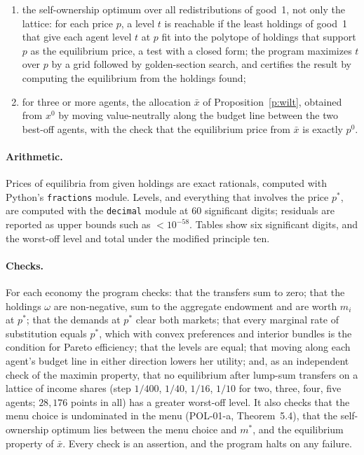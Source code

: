 \documentclass{situationist-preprint}
\begin{document}
\begin{enumerate}[label=(\roman*),itemsep=0pt]
\item the self-ownership optimum over all redistributions of good~1, not only the lattice: for each price $p$, a level $t$ is reachable if the least holdings of good~1 that give each agent level $t$ at $p$ fit into the polytope of holdings that support $p$ as the equilibrium price, a test with a closed form; the program maximizes $t$ over $p$ by a grid followed by golden-section search, and certifies the result by computing the equilibrium from the holdings found;
\item for three or more agents, the allocation $\bar{x}$ of Proposition~\ref{p:wilt}, obtained from $x^0$ by moving value-neutrally along the budget line between the two best-off agents, with the check that the equilibrium price from $\bar{x}$ is exactly $p^0$.
\end{enumerate}

\paragraph{Arithmetic.} Prices of equilibria from given holdings are exact rationals, computed with Python's \texttt{fractions} module. Levels, and everything that involves the price $p^*$, are computed with the \texttt{decimal} module at $60$ significant digits; residuals are reported as upper bounds such as $<10^{-58}$. Tables show six significant digits, and the worst-off level and total under the modified principle ten.

\paragraph{Checks.} For each economy the program checks: that the transfers sum to zero; that the holdings $\omega$ are non-negative, sum to the aggregate endowment and are worth $m_i$ at $p^*$; that the demands at $p^*$ clear both markets; that every marginal rate of substitution equals $p^*$, which with convex preferences and interior bundles is the condition for Pareto efficiency; that the levels are equal; that moving along each agent's budget line in either direction lowers her utility; and, as an independent check of the maximin property, that no equilibrium after lump-sum transfers on a lattice of income shares (step $1/400$, $1/40$, $1/16$, $1/10$ for two, three, four, five agents; $28{,}176$ points in all) has a greater worst-off level. It also checks that the menu choice is undominated in the menu (POL-01-a, Theorem~5.4), that the self-ownership optimum lies between the menu choice and $m^*$, and the equilibrium property of $\bar{x}$. Every check is an assertion, and the program halts on any failure.
\end{document}
